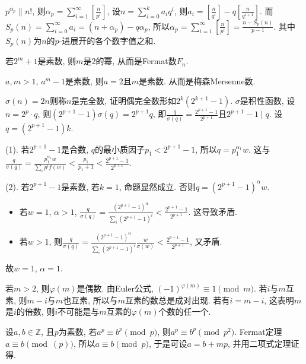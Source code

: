 \bq{}{}
$p^{\alpha_{p}}\| n!$, 则$\alpha_p=\sum_{i=1}^{\infty}\left[\frac{n}{p^i}\right]$, 设$n=\sum_{i=0}^{k}a_iq^i$, 则$a_{i}=\left[\frac{n}{q^i}\right]-q\left[\frac{n}{q^{i+1}}\right]$.
而$S_{p}(n)=\sum_{i=0}^{\infty}a_{i}=(n+\alpha_{p})-q\alpha_{p}$, 所以$\alpha_{p}=\sum_{i=1}^{\infty}\left[\frac{n}{p^i}\right]=\frac{n-S_{p}(n)}{p-1}$.
其中$S_{p}(n)$为$n$的$p$-进展开的各个数字值之和.
\eq

\bq{}{}
若$2^m+1$是素数, 则$m$是$2$的幂, 从而是Fermat数$F_{n}$.

$a,m>1$, $a^m-1$是素数, 则$a=2$且$m$是素数. 从而是梅森Mersenne数.
\eq

$\sigma(n)=2n$则称$n$是完全数, 证明偶完全数形如$2^k(2^{k+1}-1)$.
\eq
\ba
$\sigma$是积性函数, 设$n=2^p\cdot q$, 则$(2^{p+1}-1)\sigma(q)=2^{p+1}q$, 即$\frac{q}{\sigma(q)}=\frac{2^{p+1}-1}{2^{p+1}}$且$2^{p+1}-1\mid q$.
设$q=(2^{p+1}-1)k$.

(1). 若$2^{p+1}-1$是合数, $q$的最小质因子$p_1<2^{p+1}-1$, 所以$q=p_{1}^{\alpha_1}w$. 这与$\frac{q}{\sigma(q)}=\frac{p_1^{\alpha_1}w}{\sum_{i}p^{i}f(w)}<\frac{p_1}{p_1+1}<\frac{2^{p+1}-1}{2^{p+1}}$.

(2). 若$2^{p+1}-1$是素数, 若$k=1$, 命题显然成立. 否则$q=(2^{p+1}-1)^{\alpha}w$.
\begin{itemize}
 \item 若$w=1$, $\alpha>1$, $\frac{q}{\sigma(q)}=\frac{(2^{p+1}-1)^{\alpha}}{\sum_{i}(2^{p+1}-1)^i}<\frac{2^{p+1}-1}{2^{p+1}}$. 这导致矛盾.
 \item 若$w>1$, 则$\frac{q}{\sigma(q)}=\frac{(2^{p+1}-1)^{\alpha}}{\sum_{i}(2^{p+1}-1)^i}\frac{w}{\sigma(w)}<\frac{2^{p+1}-1}{2^{p+1}}$, 又矛盾.
\end{itemize}
故$w=1$, $\alpha=1$.
\ea

\bq{}{}
若$m>2$, 则$\varphi(m)$是偶数.
\eq
\ba
由Euler公式, $(-1)^{\varphi(m)}\equiv1\pmod{m}$.
\ea
\ba
若$i$与$m$互素, 则$m-i$与$m$也互素, 所以与$m$互素的数总是成对出现. 若有$i=m-i$, 这表明$m$是$i$的倍数, 则$i$不可能是与$m$互素的$\varphi(m)$个数的任一个.
\ea

\bq{}{}
设$a,b\in\mathbb{Z}$, 且$p$为素数, 若$a^p\equiv b^p\pmod{p}$, 则$a^p\equiv b^p\pmod{p^2}$.
\eq
\ba
Fermat定理$a\equiv b\pmod(p)$, 所以$a\equiv b\pmod{p}$, 于是可设$a=b+mp$, 并用二项式定理证得.
\ea


